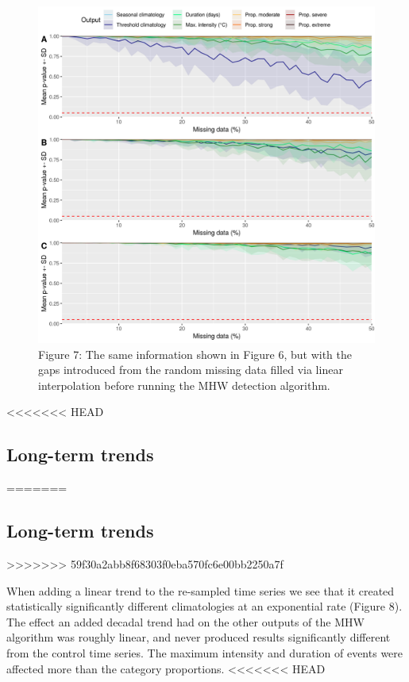 \documentclass[]{article}
\begin{document}
{\begin{figure}
\centering
\includegraphics{../LaTeX/fig_7.png}
\caption{Figure 7: The same information shown in Figure 6, but with the
gaps introduced from the random missing data filled via linear
interpolation before running the MHW detection algorithm.}
\end{figure}

<<<<<<< HEAD
\hypertarget{long-term-trends}{%
\subsection{Long-term trends}\label{long-term-trends}}
=======
\subsection{Long-term trends}\label{long-term-trends}
>>>>>>> 59f30a2abb8f68303f0eba570fc6e00bb2250a7f

When adding a linear trend to the re-sampled time series we see that it
created statistically significantly different climatologies at an
exponential rate (Figure 8). The effect an added decadal trend had on
the other outputs of the MHW algorithm was roughly linear, and never
produced results significantly different from the control time series.
The maximum intensity and duration of events were affected more than the
category proportions.
<<<<<<< HEAD

}
\end{document}
